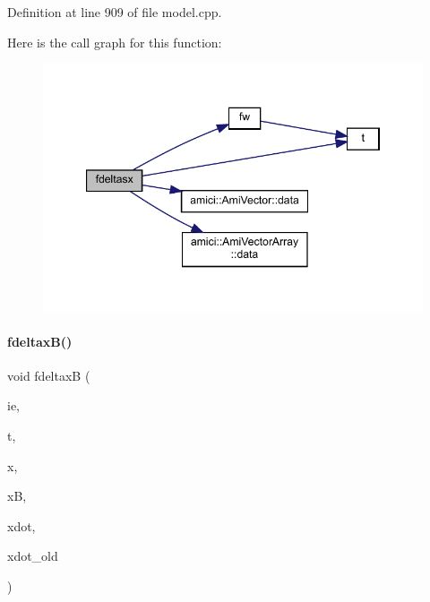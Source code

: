 Definition at line 909 of file model.\+cpp.

Here is the call graph for this function\+:
\nopagebreak
\begin{figure}[H]
\begin{center}
\leavevmode
\includegraphics[width=347pt]{classamici_1_1_model_a685b7374d29d96f7d40d83c7d92fcf27_cgraph}
\end{center}
\end{figure}
\mbox{\label{classamici_1_1_model_a5542077fa03103e502349d92dc95f33a}} 
\paragraph{\texorpdfstring{fdeltax\+B()}{fdeltaxB()}\hspace{0.1cm}{\footnotesize\ttfamily [1/2]}}
{\footnotesize\ttfamily void fdeltaxB (\begin{DoxyParamCaption}\item[{const int}]{ie,  }\item[{const \mbox{\hyperlink{namespaceamici_a1bdce28051d6a53868f7ccbf5f2c14a3}{realtype}}}]{t,  }\item[{const \mbox{\hyperlink{classamici_1_1_ami_vector}{Ami\+Vector}} $\ast$}]{x,  }\item[{const \mbox{\hyperlink{classamici_1_1_ami_vector}{Ami\+Vector}} $\ast$}]{xB,  }\item[{const \mbox{\hyperlink{classamici_1_1_ami_vector}{Ami\+Vector}} $\ast$}]{xdot,  }\item[{const \mbox{\hyperlink{classamici_1_1_ami_vector}{Ami\+Vector}} $\ast$}]{xdot\+\_\+old }\end{DoxyParamCaption})}

